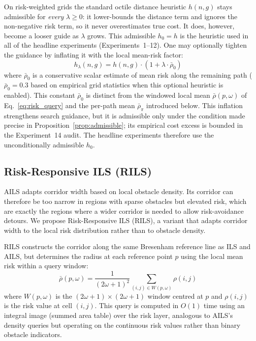 \documentclass[preprint,12pt,authoryear]{elsarticle}
\begin{document}
On risk-weighted grids the standard octile distance heuristic $h(n, g)$ stays admissible for \emph{every} $\lambda \geq 0$: it lower-bounds the distance term and ignores the non-negative risk term, so it never overestimates true cost. It does, however, become a looser guide as $\lambda$ grows. This admissible $h_0 = h$ is the heuristic used in all of the headline experiments (Experiments~1--12). One may optionally tighten the guidance by inflating it with the local mean-risk factor:
\begin{equation}\label{eq:heuristic}
    h_\lambda(n, g) = h(n, g) \cdot (1 + \lambda \cdot \bar{\rho}_0)
\end{equation}
where $\bar{\rho}_0$ is a conservative scalar estimate of mean risk along the remaining path ($\bar{\rho}_0 = 0.3$ based on empirical grid statistics when this optional heuristic is enabled). This constant $\bar{\rho}_0$ is distinct from the windowed local mean $\bar{\rho}(p,\omega)$ of Eq.~\eqref{eq:risk_query} and the per-path mean $\bar{\rho}_\pi$ introduced below.
This inflation strengthens search guidance, but it is admissible only under the condition made precise in Proposition~\ref{prop:admissible}; its empirical cost excess is bounded in the Experiment~14 audit. The headline experiments therefore use the unconditionally admissible $h_0$.

\subsection{Risk-Responsive ILS (RILS)}\label{subsec:rils}

AILS adapts corridor width based on local obstacle density. Its corridor can therefore be too narrow in regions with sparse obstacles but elevated risk, which are exactly the regions where a wider corridor is needed to allow risk-avoidance detours.
We propose Risk-Responsive ILS (RILS), a variant that adapts corridor width to the local risk distribution rather than to obstacle density.

RILS constructs the corridor along the same Bresenham reference line as ILS and AILS, but determines the radius at each reference point $p$ using the local mean risk within a query window:
\begin{equation}\label{eq:risk_query}
    \bar{\rho}(p, \omega) = \frac{1}{(2\omega+1)^2} \sum_{(i,j) \in W(p,\omega)} \rho(i,j)
\end{equation}
where $W(p, \omega)$ is the $(2\omega+1) \times (2\omega+1)$ window centred at $p$ and $\rho(i,j)$ is the risk value at cell $(i,j)$.
This query is computed in $O(1)$ time using an integral image (summed area table) over the risk layer, analogous to AILS's density queries but operating on the continuous risk values rather than binary obstacle indicators.
\end{document}
